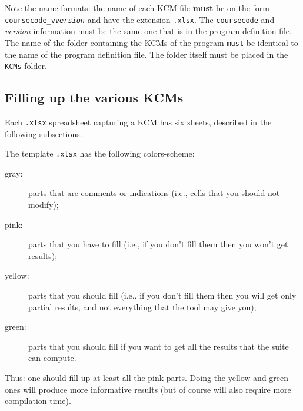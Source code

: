 Note the name formats: the name of each \ac{KCM} file \textbf{must} be on the form \texttt{coursecode\_v\textit{version}} and have the extension \texttt{.xlsx}. The \texttt{coursecode} and \textit{version} information must be the same one that is in the program definition file. The name of the folder containing the \acp{KCM} of the program \texttt{must} be identical to the name of the program definition file. The folder itself must be placed in the \texttt{KCMs} folder.


\subsection{Filling up the various \acp{KCM}}

Each \texttt{.xlsx} spreadsheet capturing a \ac{KCM} has six sheets, described in the following subsections.

\begin{centering}
\end{centering}

The template \texttt{.xlsx} has the following colors-scheme:
%
\begin{description}
	\item[gray:] parts that are comments or indications (i.e., cells that you should not modify);
	\item[pink:] parts that you have to fill (i.e., if you don't fill them then you won't get results); 
	\item[yellow:] parts that you should fill (i.e., if you don't fill them then you will get only partial results, and not everything that the tool may give you); 
	\item[green:] parts that you should fill if you want to get all the results that the suite can compute.
\end{description}
%
Thus: one should fill up at least all the pink parts. Doing the yellow and green ones will produce more informative results (but of course will also require more compilation time).


